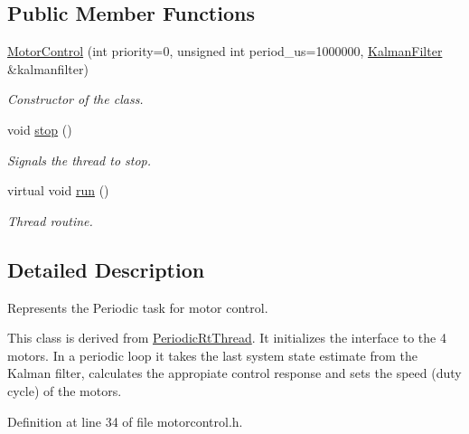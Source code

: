 \subsection*{\-Public \-Member \-Functions}
\begin{DoxyCompactItemize}
\item 
\hyperlink{class_u_s_u_1_1_motor_control_a62a00e1dc61fec92cef7879c2d90cc9a}{\-Motor\-Control} (int priority=0, unsigned int period\-\_\-us=1000000, \hyperlink{class_u_s_u_1_1_kalman_filter}{\-Kalman\-Filter} \&kalmanfilter)
\begin{DoxyCompactList}\small\item\em \-Constructor of the class. \end{DoxyCompactList}\item 
void \hyperlink{class_u_s_u_1_1_motor_control_aa317c39d73f244913c54c80284130eab}{stop} ()
\begin{DoxyCompactList}\small\item\em \-Signals the thread to stop. \end{DoxyCompactList}\item 
virtual void \hyperlink{class_u_s_u_1_1_motor_control_a1c7a621170352b9bdd4e5a60feee24c8}{run} ()
\begin{DoxyCompactList}\small\item\em \-Thread routine. \end{DoxyCompactList}\end{DoxyCompactItemize}


\subsection{\-Detailed \-Description}
\-Represents the \-Periodic task for motor control. 

\-This class is derived from \hyperlink{class_u_s_u_1_1_periodic_rt_thread}{\-Periodic\-Rt\-Thread}. \-It initializes the interface to the 4 motors. \-In a periodic loop it takes the last system state estimate from the \-Kalman filter, calculates the appropiate control response and sets the speed (duty cycle) of the motors. 

\-Definition at line 34 of file motorcontrol.\-h.



